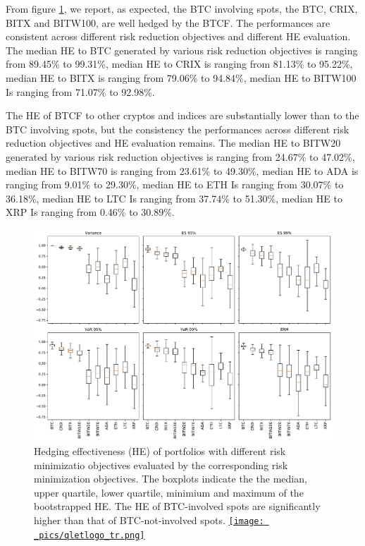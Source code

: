 From figure \ref{fig:HEboxplot}, we report, as expected, the BTC involving spots, the BTC, CRIX, BITX and BITW100, are well hedged by the BTCF.
The performances are consistent across different risk reduction objectives and different HE evaluation.
The median HE to BTC generated by various risk reduction objectives is ranging from 89.45\% to 99.31\%, median HE to CRIX is ranging from 81.13\% to 95.22\%,
median HE to BITX is ranging from 79.06\% to 94.84\%, median HE to BITW100 Is ranging from 71.07\% to 92.98\%. \medskip

The HE of BTCF to other cryptos and indices are substantially lower than to the BTC involving spots, but the consistency the performances across different risk reduction objectives and HE evaluation remains.
The median HE to BITW20 generated by various risk reduction objectives is ranging from 24.67\% to 47.02\%, median HE to BITW70 is ranging from 23.61\% to 49.30\%,
median HE to ADA is ranging from 9.01\% to 29.30\%, median HE to ETH Is ranging from 30.07\% to 36.18\%, median HE to LTC Is ranging from 37.74\% to 51.30\%,
median HE to XRP Is ranging from 0.46\% to 30.89\%.
\begin{figure}[h]
\includegraphics[width=\textwidth]{_pics/ES5_HE_boxplot.pdf}
  \caption{Hedging effectiveness (HE) of portfolios with different risk minimizatio objectives evaluated by the corresponding risk minimization objectives.
            The boxplots indicate the the median, upper quartile, lower quartile, minimium and maximum of the bootstrapped HE.
            The HE of BTC-involved spots are significantly higher than that of BTC-not-involved spots.
  \href{http://www.quantlet.com/}{\texttt{[image: \_pics/qletlogo\_tr.png]}} }
\label{fig:HEboxplot}
\end{figure}


